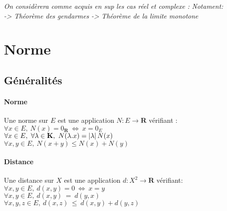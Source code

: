 

\textit{\small On considèrera comme acquis en sup les cas réel et complexe : Notament:\\ -> Théorème des gendarmes \hfill -> Théorème de la limite monotone} \hfill ${}$

\minitoc

\section{Norme}

	\subsection{Généralités}
	
		\vspace{-15pt}
		\traitd
		\paragraph{Norme} Une norme sur $E$ est une application $N: E \rightarrow\mathbf{R}$ vérifiant : \\
			\hspace*{2.5cm}{\small 1)} $\forall x\in E, ~N(x) = 0_{\mathbf{R}} ~\Leftrightarrow ~x=0_E$\\
			\hspace*{2.5cm}{\small 2)} $\forall x\in E, ~\forall \lambda \in \mathbf{K} , ~N(\lambda .x) = \left\vert \lambda \right\vert N(x)$ \\
			\hspace*{2.5cm}{\small 3)} $ \forall x,y \in E, ~N(x+y) \leq N(x)+N(y)$ 
		\trait 
		
			
		\traitd
		\paragraph{Distance} Une distance sur $X$ est une application $d:X^2\rightarrow\mathbf{R}$ vérifiant: \\
			\hspace*{2.5cm}{\small 1)} $\forall x,y\in E, ~d(x,y) = 0 ~\Leftrightarrow ~x=y$\\
			\hspace*{2.5cm}{\small 2)} $\forall x,y\in E, ~d(x,y)~=~d(y,x)$ \\
			\hspace*{2.5cm}{\small 3)} $\forall x,y,z\in E, ~d(x,z)~\leq~d(x,y)+d(y,z)$ 
		\trait
		
